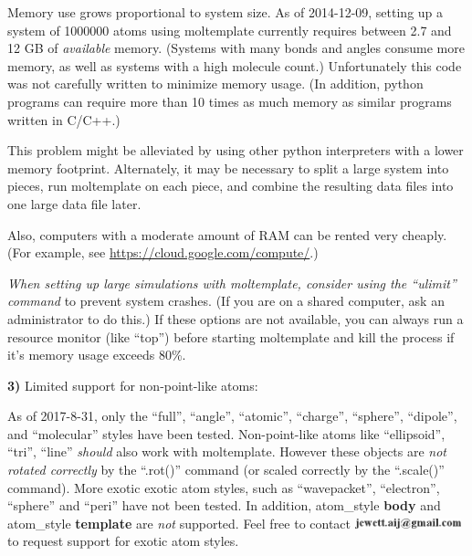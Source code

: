 \documentclass[11pt]{article}
\begin{document}
Memory use grows proportional to system size.
As of 2014-12-09, setting up a system of 1000000 atoms using moltemplate 
currently requires between 2.7 and 12 GB of \textit{available} memory. 
(Systems with many bonds and angles consume more memory, 
 as well as systems with a high molecule count.)
Unfortunately this code was not carefully written to minimize memory usage. 
(In addition, python programs can require more than 10 
times as much memory as similar programs written in C/C++.)

This problem might be alleviated by using other 
python interpreters with a lower memory footprint.
Alternately, it may be necessary to split a large system into pieces, 
run moltemplate on each piece, and combine the resulting data files 
into one large data file later.

Also, computers with a moderate amount of RAM can be rented very cheaply.
(For example, see \url{https://cloud.google.com/compute/}.)

\textit{When setting up large simulations with moltemplate,
consider using the \mbox{``ulimit''} command}
to prevent system crashes.
(If you are on a shared computer, ask an administrator to do this.)
If these options are not available,
you can always run a resource monitor (like ``top'') before 
starting moltemplate and kill the process if it's memory usage exceeds 80\%.


\textbf{3)} Limited support for non-point-like atoms:

As of 2017-8-31, only the ``full'', ``angle'', ``atomic'', ``charge'',
``sphere'', ``dipole'', and ``molecular'' styles have been tested.  
Non-point-like atoms like ``ellipsoid'', ``tri'', ``line'' 
\textit{should} also work with moltemplate. 
However these objects
are \textit{not rotated correctly} 
by the ``.rot()'' command
(or scaled correctly by the ``.scale()'' command).
More exotic exotic atom styles, such as 
``wavepacket'', ``electron'', ``sphere'' and ``peri''
have not been tested.
In addition, atom\_style \textbf{body} and 
atom\_style \textbf{template} are \textit{not} 
supported.
Feel free to contact \includegraphics[height=0.3cm]{author_email.png}
to request support for exotic atom styles.
\end{document}
